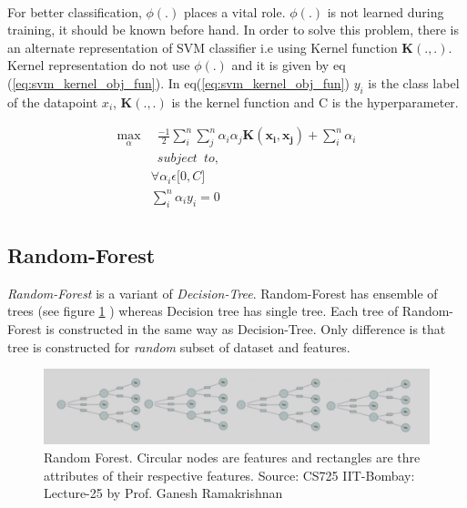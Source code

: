 \documentclass{report}
\begin{document}
\noindent\\
For better classification, $\phi(.)$  places a vital role. $\phi(.)$ is not learned during training, it should be known before hand. In order to solve this problem, there is an alternate representation of SVM classifier i.e using Kernel function $\boldsymbol{K(.,.)}$. Kernel representation do not use $\phi(.)$ and it is given by eq (\ref{eq:svm_kernel_obj_fun}). In eq(\ref{eq:svm_kernel_obj_fun}) $y_i$ is the class label of the datapoint $x_i$, $\boldsymbol{K(.,.)}$ is the kernel function and C is the hyperparameter.

\begin{equation}\label{eq:svm_kernel_obj_fun}
  \begin{aligned}
     \max\limits_{\alpha} & \enspace \frac{-1}{2} \sum\limits_i^n \sum\limits_j^n \alpha_i \alpha_j \boldsymbol{K(x_i,x_j)}  + \sum\limits_i^n \alpha_i \\
     &\enspace  subject \enspace to,\\
     &\forall \alpha_i \epsilon \big[0,C]\\
     &\sum\limits_i^n \alpha_i y_i = 0\\
  \end{aligned}
\end{equation}

\subsection{Random-Forest}
\textit{Random-Forest} is a variant of \textit{Decision-Tree}. Random-Forest has ensemble of trees (see figure \ref{fig: Random-Forest} ) whereas Decision tree has single tree. Each tree of Random-Forest is constructed in the same way as Decision-Tree. Only difference is that tree is constructed for \textit{random} subset of dataset and features.

\begin{figure}[H]
\includegraphics[width=1\linewidth]{random-forest.png}
\centering
\captionsetup{justification=centering}
\caption{Random Forest. Circular nodes are features and rectangles are thre attributes of their respective features. Source: CS725 IIT-Bombay: Lecture-25 by Prof. Ganesh Ramakrishnan}
\label{fig: Random-Forest}
\end{figure}
\end{document}
